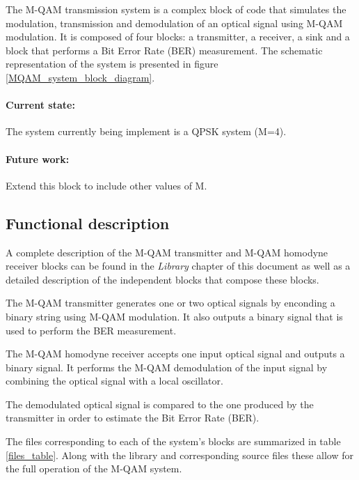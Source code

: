The M-QAM transmission system is a complex block of code that simulates the modulation, transmission and
demodulation of an optical signal using M-QAM modulation.
It is composed of four blocks: a transmitter, a receiver, a sink and a block that performs a Bit Error Rate (BER) measurement. The schematic representation of the
system is presented in figure \ref{MQAM_system_block_diagram}.

\paragraph{Current state:} The system currently being implement is a QPSK system (M=4).

\paragraph{Future work:} Extend this block to include other values of M.

\subsection*{Functional description}

A complete description of the M-QAM transmitter and M-QAM homodyne receiver blocks can be found in the \textit{Library} chapter of this document as well as a detailed description of the independent blocks that compose these blocks.

The M-QAM transmitter generates one or two optical signals by enconding a binary string using M-QAM modulation. It also outputs a binary signal that is used to perform the BER measurement.

The M-QAM homodyne receiver accepts one input optical signal and outputs
a binary signal. It performs the M-QAM demodulation of the input signal by combining the optical signal with a local oscillator.

The demodulated optical signal is compared to the one produced by the transmitter in order to estimate the Bit Error Rate (BER).

The files corresponding to each of the system's blocks are summarized in table \ref{files_table}. Along with the library and corresponding source files these allow for the full operation of the M-QAM system.

